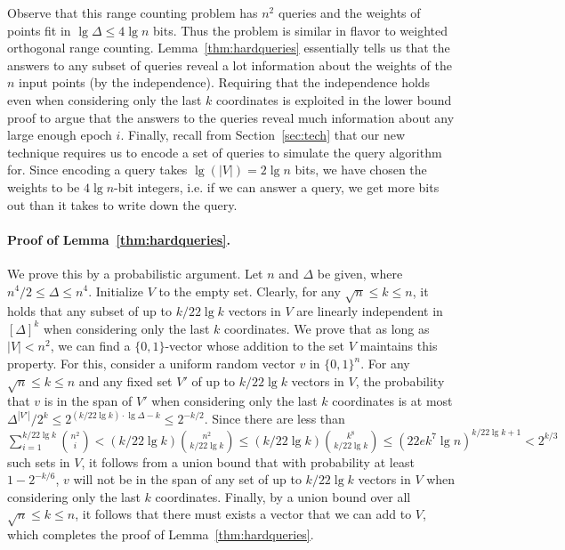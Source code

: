 \documentclass[letterpaper]{article}
\begin{document}
Observe that this range counting problem has $n^2$ queries and the
weights of points fit in $\lg \Delta \leq 4\lg n$ bits. Thus the
problem is similar in flavor to weighted orthogonal range
counting. Lemma~\ref{thm:hardqueries} essentially tells us that the
answers to any subset of queries reveal a lot information about the
weights of the $n$ input points (by the independence). Requiring that
the independence holds even when considering only the last $k$
coordinates is exploited in the lower bound proof to argue that the
answers to the queries reveal much information about any large enough
epoch $i$. Finally, recall from Section~\ref{sec:tech} that our new
technique requires us to encode a set of queries to simulate the query
algorithm for. Since encoding a query takes $\lg(|V|)=2\lg n$ bits, we
have chosen the weights to be $4\lg n$-bit integers, i.e. if we can
answer a query, we get more bits out than it takes to write down the
query.

\paragraph{Proof of Lemma~\ref{thm:hardqueries}.}
We prove this by a probabilistic argument. Let $n$ and $\Delta$ be
given, where $n^4/2 \leq \Delta \leq n^4$. Initialize $V$ to the empty
set. Clearly, for any $\sqrt{n} \leq k \leq n$, it holds that any
subset of up to $k/22\lg k$ vectors in $V$ are linearly independent in
$[\Delta]^k$ when considering only the last $k$ coordinates. We prove
that as long as $|V| < n^2$, we can find a $\{0,1\}$-vector whose
addition to the set $V$ maintains this property. For this, consider a
uniform random vector $v$ in $\{0,1\}^n$. For any $\sqrt{n} \leq k
\leq n$ and any fixed set $V'$ of up to $k/22\lg k$ vectors in $V$,
the probability that $v$ is in the span of $V'$ when considering only
the last $k$ coordinates is at most $\Delta^{|V'|}/2^k \leq 2^{(k/22\lg
  k) \cdot \lg \Delta-k} \leq 2^{-k/2}$. Since there are less than
$\sum_{i=1}^{k/22\lg k}\binom{n^2}{i} < (k/22\lg k)\binom{n^2}{k/22\lg
  k} \leq (k/22\lg k)\binom{k^8}{k/22\lg k} \leq (22e k^7\lg n)^{k/22
  \lg k+1} < 2^{k/3}$ such sets in $V$, it follows from a union bound
that with probability at least $1-2^{-k/6}$, $v$ will not be in the
span of any set of up to $k/22\lg k$ vectors in $V$ when considering
only the last $k$ coordinates. Finally, by a union bound over all
$\sqrt{n} \leq k \leq n$, it follows that there must exists a vector
that we can add to $V$, which completes the proof of
Lemma~\ref{thm:hardqueries}.
\end{document}
